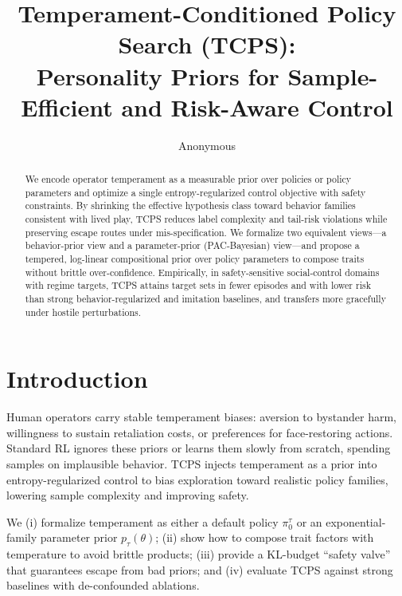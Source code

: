 \documentclass[10pt]{article}
\title{\bf Temperament-Conditioned Policy Search (TCPS):\\
Personality Priors for Sample-Efficient and Risk-Aware Control}
\author{Anonymous}
\date{}
\theoremstyle{plain}
\theoremstyle{definition}
\theoremstyle{remark}
\newcommand{\1}{\mathds{1}}
\begin{document}
\maketitle

\begin{abstract}
We encode operator temperament as a measurable prior over policies or policy parameters and optimize a single entropy-regularized control objective with safety constraints. By shrinking the effective hypothesis class toward behavior families consistent with lived play, TCPS reduces label complexity and tail-risk violations while preserving escape routes under mis-specification. We formalize two equivalent views---a behavior-prior view and a parameter-prior (PAC-Bayesian) view---and propose a tempered, log-linear compositional prior over policy parameters to compose traits without brittle over-confidence. Empirically, in safety-sensitive social-control domains with regime targets, TCPS attains target sets in fewer episodes and with lower risk than strong behavior-regularized and imitation baselines, and transfers more gracefully under hostile perturbations.
\end{abstract}

\vspace{-0.5em}
\section{Introduction}
Human operators carry stable temperament biases: aversion to bystander harm, willingness to sustain retaliation costs, or preferences for face-restoring actions. Standard RL ignores these priors or learns them slowly from scratch, spending samples on implausible behavior. TCPS injects temperament as a prior into entropy-regularized control to bias exploration toward realistic policy families, lowering sample complexity and improving safety.

We (i) formalize temperament as either a default policy $\pi_0^\tau$ or an exponential-family parameter prior $p_\tau(\theta)$; (ii) show how to compose trait factors with temperature to avoid brittle products; (iii) provide a KL-budget ``safety valve'' that guarantees escape from bad priors; and (iv) evaluate TCPS against strong baselines with de-confounded ablations.
\end{document}
